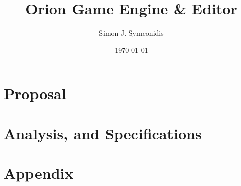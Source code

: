 \documentclass[twoside,12pt]{book}
\title{Orion Game Engine \& Editor}
\author{Simon J. Symeonidis}
\date{\today}
\begin{document}

\pagestyle{fancy}
\maketitle
\newpage
\rhead[]{\textbf{\color{psyan}\nouppercase{\rightmark}}}
\lhead[\textbf{\color{psyan}\nouppercase{\leftmark}}]{}

\newpage
\tableofcontents
\listoffigures
\newpage


\rfoot[]{\thepage}
\cfoot{}
\lfoot[\thepage]{}

\chapter{Proposal}



\chapter{Analysis, and Specifications}




\chapter{Appendix}


\begingroup
\raggedright


\endgroup
\end{document}
